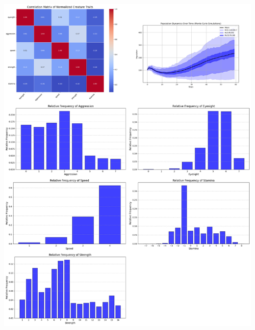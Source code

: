 \documentclass{article}
\begin{document}
\begin{center}
    \includegraphics[scale=0.21]{tests/2.5.jpg}
\end{center}
\end{document}
